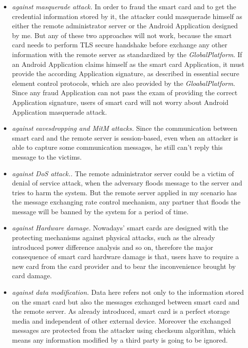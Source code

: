 \begin{itemize}
\item \emph{against masquerade attack.} In order to fraud the smart card and to get the credential information stored by it, the attacker could masquerade  himself as either the remote administrator server or the Android Application designed by me.  But any of these two approaches will not work, because the smart card needs to perform TLS secure handshake before exchange any other information with the remote server as standardized by the \emph{GlobalPlatform}. If an Android Application claims himself as the smart card Application, it must provide the according Application signature, as described in essential secure element  control protocols, which are also provided by the \emph{GloabalPlatform}. Since any fraud Application can not pass the exam of providing the correct Application signature, users of smart card will not worry about Android Application masquerade attack. 
\item \emph{against eavesdropping and MitM attacks.} Since the communication between smart card and the remote server is session-based, even when an attacker is able to capture some communication messages, he still can't reply this message to the victims. 
\item \emph{against DoS attack..} The remote administrator server could be a victim of denial of service attack, when the adversary floods message to the server and tries to harm the system. But the remote server applied in my scenario has the message exchanging rate control  mechanism, any partner that floods the message will be banned by the system for a period of time.
\item \emph{against Hardware damage.} Nowadays' smart cards are designed with the protecting mechanisms against physical attacks, such as the already introduced power difference analysis and so on, therefore the major consequence of smart card hardware damage is that, users have to require a new card from the card provider and to bear the inconvenience brought by card damage. 
\item \emph{against data modification.} Data here refers not only to the information stored on the smart card but also the messages exchanged between smart card and the remote server.  As already introduced, smart card is a perfect storage media and independent of other external device. Moreover the exchanged messages are protected from the attacker using  checksum algorithm, which means any information modified by a third party is going to be ignored.
\end{itemize}

